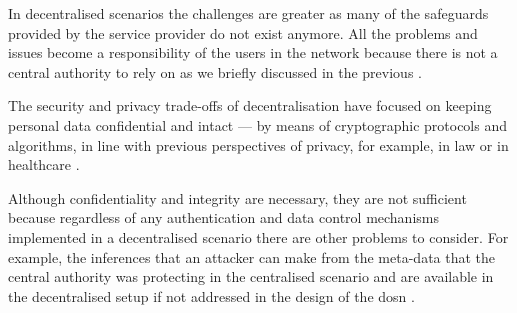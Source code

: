 In decentralised scenarios the challenges are greater as many of the safeguards 
provided by the service provider do not exist anymore. All the problems and issues 
become a responsibility of the users in the network because there is not a central 
authority to rely on as we briefly discussed in the previous .

The security and privacy trade-offs of decentralisation have focused on keeping 
personal data confidential and intact --- by means of cryptographic protocols and 
algorithms, in line with previous perspectives of privacy, for example, in law \cite{Harvey92} 
or in healthcare \cite{BarrowsC96}. 

Although confidentiality and integrity are necessary, they are not sufficient because 
regardless of any authentication and data control mechanisms implemented in a decentralised 
scenario there are other problems to consider. For example, the inferences that 
an attacker can make from the meta-data that the central authority was protecting 
in the centralised scenario and are available in the decentralised setup if not addressed 
in the design of the \ac{dosn} \cite{GreschbachKB12}.


%
%
%
%

